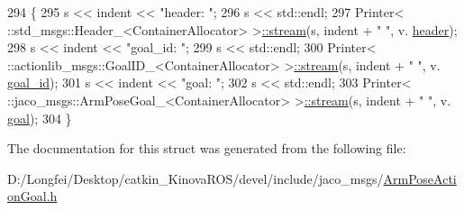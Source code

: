 \begin{DoxyCode}
294   \{
295     s << indent << \textcolor{stringliteral}{"header: "};
296     s << std::endl;
297     Printer< ::std\_msgs::Header\_<ContainerAllocator> >\hyperlink{structros_1_1message__operations_1_1Printer_3_01_1_1jaco__msgs_1_1ArmPoseActionGoal___3_01ContainerAllocator_01_4_01_4_a57d43f31b8fdeebc2bbc3c5975ee7228}{::stream}(s, indent + \textcolor{stringliteral}{"  "}, v.
      \hyperlink{structjaco__msgs_1_1ArmPoseActionGoal___afb64a7a2cf0f0b1238fb648892309b73}{header});
298     s << indent << \textcolor{stringliteral}{"goal\_id: "};
299     s << std::endl;
300     Printer< ::actionlib\_msgs::GoalID\_<ContainerAllocator> >\hyperlink{structros_1_1message__operations_1_1Printer_3_01_1_1jaco__msgs_1_1ArmPoseActionGoal___3_01ContainerAllocator_01_4_01_4_a57d43f31b8fdeebc2bbc3c5975ee7228}{::stream}(s, indent + \textcolor{stringliteral}{"  "}, v.
      \hyperlink{structjaco__msgs_1_1ArmPoseActionGoal___a31706511987f26a7957034725c70f0d0}{goal\_id});
301     s << indent << \textcolor{stringliteral}{"goal: "};
302     s << std::endl;
303     Printer< ::jaco\_msgs::ArmPoseGoal\_<ContainerAllocator> >\hyperlink{structros_1_1message__operations_1_1Printer_3_01_1_1jaco__msgs_1_1ArmPoseActionGoal___3_01ContainerAllocator_01_4_01_4_a57d43f31b8fdeebc2bbc3c5975ee7228}{::stream}(s, indent + \textcolor{stringliteral}{"  "}, v.
      \hyperlink{structjaco__msgs_1_1ArmPoseActionGoal___ab45ae30e9322a91a845c852749425c97}{goal});
304   \}
\end{DoxyCode}


The documentation for this struct was generated from the following file\+:\begin{DoxyCompactItemize}
\item 
D\+:/\+Longfei/\+Desktop/catkin\+\_\+\+Kinova\+R\+O\+S/devel/include/jaco\+\_\+msgs/\hyperlink{ArmPoseActionGoal_8h}{Arm\+Pose\+Action\+Goal.\+h}\end{DoxyCompactItemize}
